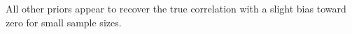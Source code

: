 \documentclass[12pt]{article}
\begin{document}
All other priors appear to recover the true correlation with a slight bias toward zero for small sample sizes.
% 
% 
\end{document}
